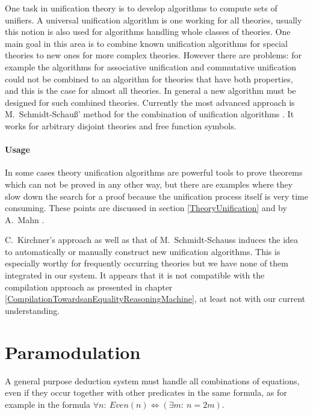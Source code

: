 One task in unification theory is to develop
algorithms to compute sets of unifiers. A universal 
unification algorithm is one working for all theories,
usually this notion is also used for algorithms handling
whole classes of theories. One main goal in this area is to combine known
unification algorithms for special theories 
to new ones for more complex theories. However there are problems:
for example the algorithms for associative
unification and commutative unification could not be combined to an
algorithm for theories that have both properties, and this is the case for
almost all theories. In general a new
algorithm must be designed for such combined theories. Currently the
most advanced
approach is M.\ Schmidt-Schau{\ss}' method for the combination of unification 
algorithms \cite{Schmidt87}. It works for arbitrary disjoint
theories and free function symbols.


\paragraph{Usage}

In some cases theory unification algorithms are powerful tools to prove
theorems which can not be proved in any other way, but there are examples 
where they slow down the search for a proof because the unification process
itself is very time consuming. These points are discussed in section
\ref{TheoryUnification} and by A.\ Mahn \cite{Mahn91}.

C.\ Kirchner's approach \cite{Kirchner85} as well as that of 
M.\ Schmidt-Schauss induces the idea
to automatically or manually construct new 
unification algorithms. This is especially worthy for frequently occurring 
theories but we have none of them integrated in our system. It appears that
it is not 
compatible with the compilation approach as presented in chapter 
\ref{CompilationTowardsanEqualityReasoningMachine}, at least not with our
current understanding.


\section{Paramodulation}
\label{Paramodulation}

A general purpose deduction system must handle all
combinations of equations, even if they occur
together with other predicates in the same formula, as
for example in the formula
\hbox{$\forall n:\  Even(n)
\Leftrightarrow (\exists m: \ n=2m)$}. 

